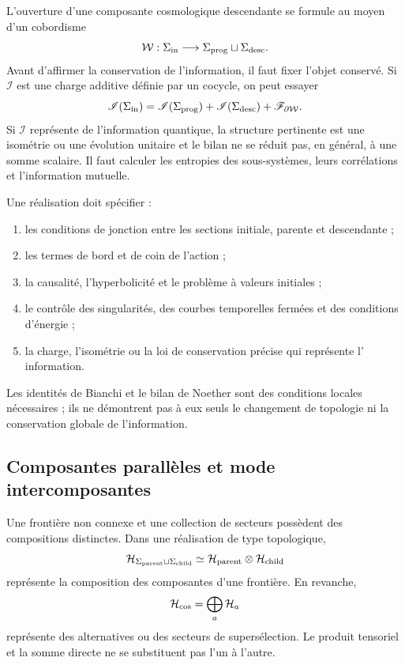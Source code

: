 L'ouverture d'une composante cosmologique descendante se formule au moyen d'un cobordisme
\[
 \mathcal W:
 \Sigma_{\rm in}
 \longrightarrow
 \Sigma_{\rm prog}\sqcup\Sigma_{\rm desc}.
\]
Avant d'affirmer la conservation de l'information, il faut fixer l'objet
conservé. Si \(\mathscr I\) est une charge additive définie par un cocycle,
on peut essayer
\[
 \mathscr I(\Sigma_{\rm in})
 =
 \mathscr I(\Sigma_{\rm prog})
 +\mathscr I(\Sigma_{\rm desc})
 +\mathscr F_{\partial\mathcal W}.
\]
Si \(\mathscr I\) représente de l'information quantique, la structure pertinente
est une isométrie ou une évolution unitaire et le bilan ne se réduit pas, en
général, à une somme scalaire. Il faut calculer les entropies des
sous-systèmes, leurs corrélations et l'information mutuelle.

Une réalisation doit spécifier :
\begin{enumerate}
 \item les conditions de jonction entre les sections initiale, parente et
 descendante ;
 \item les termes de bord et de coin de l'action ;
 \item la causalité, l'hyperbolicité et le problème à valeurs initiales ;
 \item le contrôle des singularités, des courbes temporelles fermées et des conditions
 d'énergie ;
 \item la charge, l'isométrie ou la loi de conservation précise qui représente l'
 information.
\end{enumerate}
Les identités de Bianchi et le bilan de Noether sont des conditions locales
nécessaires ; ils ne démontrent pas à eux seuls le changement de topologie ni la
conservation globale de l'information.

\subsection{Composantes parallèles et mode intercomposantes}
\label{sec:componentes-cosmologicas-paralelas}

Une frontière non connexe et une collection de secteurs possèdent des compositions
distinctes. Dans une réalisation de type topologique,
\[
 \mathcal H_{\Sigma_{\rm parent}\sqcup\Sigma_{\rm child}}
 \simeq
 \mathcal H_{\rm parent}\otimes\mathcal H_{\rm child}
\]
représente la composition des composantes d'une frontière. En revanche,
\[
 \mathcal H_{\rm cos}
 =\bigoplus_a\mathcal H_a
\]
représente des alternatives ou des secteurs de supersélection. Le produit tensoriel
et la somme directe ne se substituent pas l'un à l'autre.

